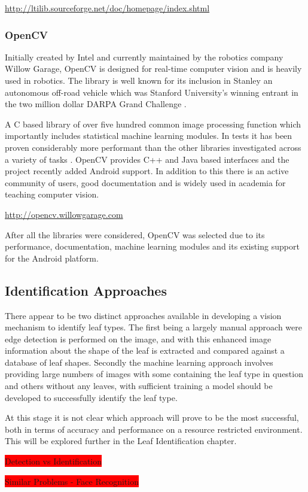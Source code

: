 \url{http://ltilib.sourceforge.net/doc/homepage/index.shtml}


\subsubsection{OpenCV}
Initially created by Intel and currently maintained by the robotics company Willow Garage, OpenCV is designed for real-time computer vision and is heavily used in robotics. The library is well known for its inclusion in Stanley an autonomous off-road vehicle which was Stanford University's winning entrant in the two million dollar DARPA Grand Challenge \cite{openCV11}. 

A C based library of over five hundred common image processing function which importantly includes statistical machine learning modules. In tests it has been proven considerably more performant than the other libraries investigated across a variety of tasks \cite{utkarsh10}. OpenCV provides C++ and Java based interfaces and the project recently added Android support. In addition to this there is an active community of users, good documentation and is widely used in academia for teaching computer vision.

\url{http://opencv.willowgarage.com}

After all the libraries were considered, OpenCV was selected due to its performance, documentation, machine learning modules and its existing support for the Android platform.

\subsection{Identification Approaches}

There appear to be two distinct approaches available in developing a vision mechanism to identify leaf types. The first being a largely manual approach were edge detection is performed on the image, and with this enhanced image information about the shape of the leaf is extracted and compared against a database of leaf shapes. Secondly the machine learning approach involves providing large numbers of images with some containing the leaf type in question and others without any leaves, with sufficient training a model should be developed to successfully identify the leaf type.

At this stage it is not clear which approach will prove to be the most successful, both in terms of accuracy and performance on a resource restricted environment. This will be explored further in the Leaf Identification chapter.

\colorbox{red}{Detection vs Identification}

\colorbox{red}{Similar Problems - Face Recognition}

